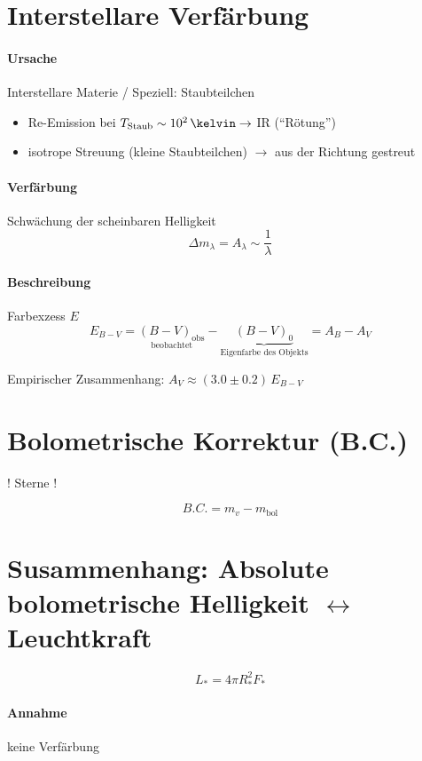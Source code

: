 \section{Interstellare Verfärbung}
\paragraph{Ursache} Interstellare Materie / Speziell: Staubteilchen


\begin{itemize}
    \item Re-Emission bei $T_{\text{Staub}} \sim 10^2\,\kelvin \rightarrow$ IR ("`Rötung"')
    \item isotrope Streuung (kleine Staubteilchen) $\rightarrow$ aus der Richtung gestreut
\end{itemize}

\paragraph{Verfärbung} Schwächung der scheinbaren Helligkeit
\[ \Delta m_{\lambda} = A_{\lambda} \sim \frac{1}{\lambda} \]

\paragraph{Beschreibung} Farbexzess $E$
\[ E_{B-V} = \underset{\text{beobachtet}}{(B-V)_{\mathrm{obs}}} - \underbrace{(B-V)_0}_{\text{Eigenfarbe des Objekts}} = A_B - A_V \]

Empirischer Zusammenhang: $A_V \approx (3.0 \pm 0.2)\,E_{B-V}$

\section{Bolometrische Korrektur (B.C.)}
! Sterne !


\[ \boxed{B.C. = m_v - m_{\mathrm{bol}}} \]


\section{Susammenhang: Absolute bolometrische Helligkeit $\leftrightarrow$ Leuchtkraft}
\[ L_* = 4 \pi R_*^2 F_* \]

\paragraph{Annahme} keine Verfärbung

